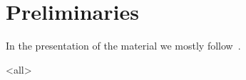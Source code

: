 \section{Preliminaries}

\mode*
In the presentation of the material we mostly
follow~\cite{Axler2020,Simon2015,Rodriguez2021}.

\mode<all>





